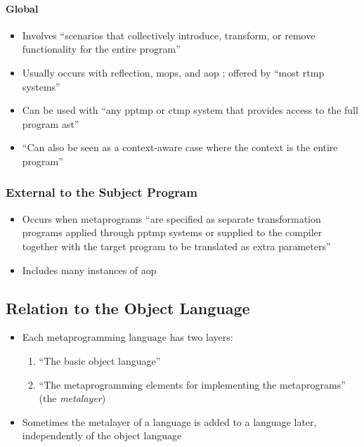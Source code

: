 \paragraph{Global \citep[p.~113:26]{lilis_survey_2019}}
\begin{itemize}
      \item Involves ``scenarios that collectively introduce, transform, or
            remove functionality for the entire program''
            \citep[p.~113:26]{lilis_survey_2019}
      \item Usually occurs with reflection, \acsp{mop}, and \acs{aop}
            \citep[p.~113:26]{lilis_survey_2019}; offered by ``most \acs{rtmp}
            systems'' \citep[p.~113:31]{lilis_survey_2019}
      \item Can be used with ``any \acs{pptmp} or \acs{ctmp} system that
            provides access to the full program \acs{ast}''
            \citep[p.~113:26]{lilis_survey_2019}
      \item ``Can also be seen as a context-aware case where the context is the
            entire program'' \citep[p.~113:26]{lilis_survey_2019}
\end{itemize}

\subsubsection{External to the Subject Program \citep[p.~113:27]{lilis_survey_2019}}
\begin{itemize}
      \item Occurs when metaprograms ``are specified as separate transformation
            programs applied through \acs{pptmp} systems or supplied to the
            compiler together with the target program to be translated as extra
            parameters'' \citep[p.~113:27]{lilis_survey_2019}
      \item Includes many instances of \acs{aop} \citep[p.~113:27]{lilis_survey_2019}
\end{itemize}

\subsection{Relation to the Object Language}
\begin{itemize}
      \item Each metaprogramming language has two layers:
            \begin{enumerate}
                  \item ``The basic object language''
                  \item ``The metaprogramming elements for implementing the
                        metaprograms'' (the \emph{metalayer})
                        \citep[p.~113:27]{lilis_survey_2019}
            \end{enumerate}
      \item Sometimes the metalayer of a language is added to a language later,
            independently of the object language \citep[p.~113:27]{lilis_survey_2019}
\end{itemize}

